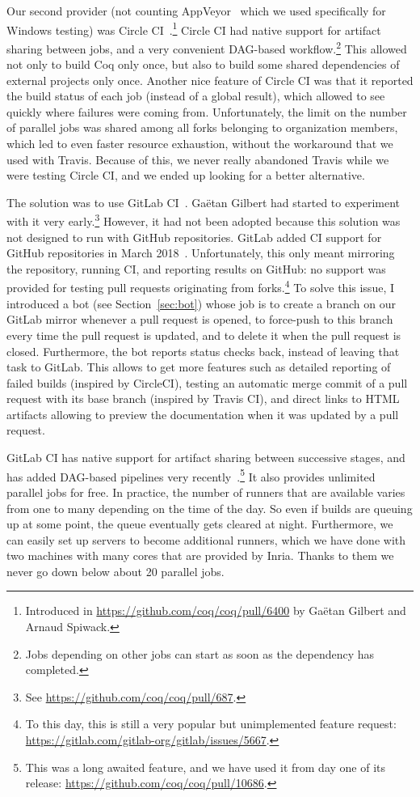 Our second provider (not counting AppVeyor~\cite{appveyor} which we used specifically for Windows testing) was Circle CI~\cite{circleci}.\footnote{
	Introduced in \url{https://github.com/coq/coq/pull/6400} by Ga\"etan Gilbert and Arnaud Spiwack.
}
Circle CI had native support for artifact sharing between jobs, and a very convenient DAG-based workflow.\footnote{
	Jobs depending on other jobs can start as soon as the dependency has completed.
}
This allowed not only to build Coq only once, but also to build some shared dependencies of external projects only once.
Another nice feature of Circle CI was that it reported the build status of each job (instead of a global result), which allowed to see quickly where failures were coming from.
Unfortunately, the limit on the number of parallel jobs was shared among all forks belonging to organization members, which led to even faster resource exhaustion, without the workaround that we used with Travis.
Because of this, we never really abandoned Travis while we were testing Circle CI, and we ended up looking for a better alternative.

The solution was to use GitLab CI~\cite{gitlab}.
Ga\"etan Gilbert had started to experiment with it very early.\footnote{
	See \url{https://github.com/coq/coq/pull/687}.
}
However, it had not been adopted because this solution was not designed to run with GitHub repositories.
GitLab added CI support for GitHub repositories in March 2018~\cite{gitlab_ci_for_github}.
Unfortunately, this only meant mirroring the repository, running CI, and reporting results on GitHub: no support was provided for testing pull requests originating from forks.\footnote{
	To this day, this is still a very popular but unimplemented feature request: \url{https://gitlab.com/gitlab-org/gitlab/issues/5667}.
}
To solve this issue, I introduced a bot (see Section~\ref{sec:bot}) whose job is to create a branch on our GitLab mirror whenever a pull request is opened, to force-push to this branch every time the pull request is updated, and to delete it when the pull request is closed.
Furthermore, the bot reports status checks back, instead of leaving that task to GitLab.
This allows to get more features such as detailed reporting of failed builds (inspired by CircleCI), testing an automatic merge commit of a pull request with its base branch (inspired by Travis CI), and direct links to HTML artifacts allowing to preview the documentation when it was updated by a pull request.

GitLab CI has native support for artifact sharing between successive stages, and has added DAG-based pipelines very recently~\cite{gitlab_dag}.\footnote{
	This was a long awaited feature, and we have used it from day one of its release: \url{https://github.com/coq/coq/pull/10686}.
}
It also provides unlimited parallel jobs for free.
In practice, the number of runners that are available varies from one to many depending on the time of the day.
So even if builds are queuing up at some point, the queue eventually gets cleared at night.
Furthermore, we can easily set up servers to become additional runners, which we have done with two machines with many cores that are provided by Inria.
Thanks to them we never go down below about 20 parallel jobs.


